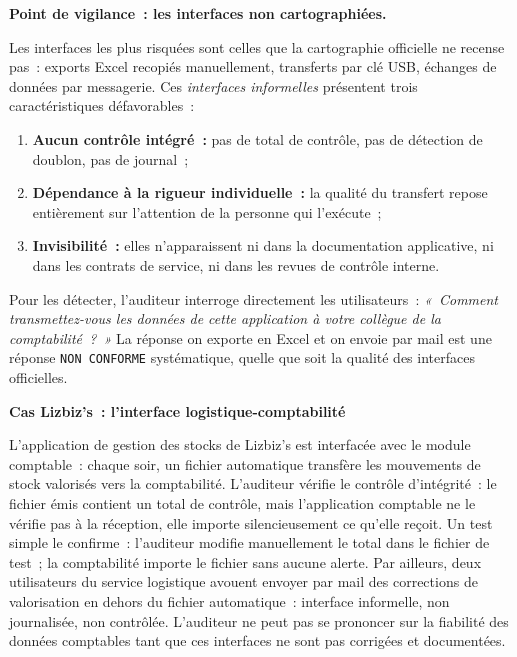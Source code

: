 \begin{boxalert}
\textbf{Point de vigilance~: les interfaces non cartographiées.}

Les interfaces les plus risquées sont celles que la cartographie officielle ne
recense pas~: exports Excel recopiés manuellement, transferts par clé USB,
échanges de données par messagerie. Ces \emph{interfaces informelles} présentent
trois caractéristiques défavorables~:
\begin{enumerate}
    \item \textbf{Aucun contrôle intégré~:} pas de total de contrôle, pas de
        détection de doublon, pas de journal~;
    \item \textbf{Dépendance à la rigueur individuelle~:} la qualité du transfert
        repose entièrement sur l'attention de la personne qui l'exécute~;
    \item \textbf{Invisibilité~:} elles n'apparaissent ni dans la documentation
        applicative, ni dans les contrats de service, ni dans les revues de contrôle
        interne.
\end{enumerate}
Pour les détecter, l'auditeur interroge directement les utilisateurs~:
\emph{«~Comment transmettez-vous les données de cette application à votre collègue
de la comptabilité~?~»} La réponse \og{}on exporte en Excel et on envoie par mail\fg{}
est une réponse \texttt{NON~CONFORME} systématique, quelle que soit la qualité des
interfaces officielles.
\end{boxalert}

\begin{boxlizbiz}
\textbf{Cas Lizbiz's~: l'interface logistique-comptabilité}

L'application de gestion des stocks de Lizbiz's est interfacée avec le module
comptable~: chaque soir, un fichier automatique transfère les mouvements de stock
valorisés vers la comptabilité. L'auditeur vérifie le contrôle d'intégrité~: le
fichier émis contient un total de contrôle, mais l'application comptable ne le
vérifie pas à la réception, elle importe silencieusement ce qu'elle reçoit. Un
test simple le confirme~: l'auditeur modifie manuellement le total dans le fichier
de test~; la comptabilité importe le fichier sans aucune alerte. Par ailleurs,
deux utilisateurs du service logistique avouent envoyer par mail des corrections
de valorisation en dehors du fichier automatique~: interface informelle, non
journalisée, non contrôlée. L'auditeur ne peut pas se prononcer sur la fiabilité
des données comptables tant que ces interfaces ne sont pas corrigées et
documentées.
\end{boxlizbiz}

